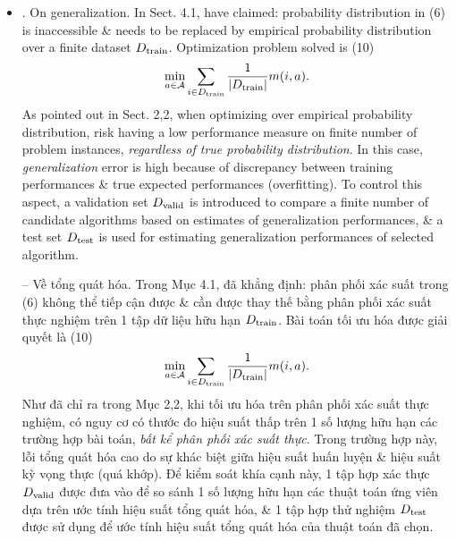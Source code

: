 \documentclass{article}
\begin{document}
\begin{itemize}
\begin{itemize}
        \item {. On generalization.} In Sect. 4.1, have claimed: probability distribution in (6) is inaccessible \& needs to be replaced by empirical probability distribution over a finite dataset $D_{\rm train}$. Optimization problem solved is (10)
        \begin{equation*}
            \min_{a\in{\cal A}}\sum_{i\in D_{\rm train}} \frac{1}{|D_{\rm train}|}m(i,a).
        \end{equation*}
        As pointed out in Sect. 2,2, when optimizing over empirical probability distribution, risk having a low performance measure on finite number of problem instances, {\it regardless of true probability distribution}. In this case, {\it generalization} error is high because of discrepancy between training performances \& true expected performances (overﬁtting). To control this aspect, a validation set $D_{\rm valid}$ is introduced to compare a finite number of candidate algorithms based on estimates of generalization performances, \& a test set $D_{\rm test}$ is used for estimating generalization performances of selected algorithm.

        -- {\sf Về tổng quát hóa.} Trong Mục 4.1, đã khẳng định: phân phối xác suất trong (6) không thể tiếp cận được \& cần được thay thế bằng phân phối xác suất thực nghiệm trên 1 tập dữ liệu hữu hạn $D_{\rm train}$. Bài toán tối ưu hóa được giải quyết là (10)
        \begin{equation*}
            \min_{a\in{\cal A}}\sum_{i\in D_{\rm train}} \frac{1}{|D_{\rm train}|}m(i,a).
        \end{equation*}
        Như đã chỉ ra trong Mục 2,2, khi tối ưu hóa trên phân phối xác suất thực nghiệm, có nguy cơ có thước đo hiệu suất thấp trên 1 số lượng hữu hạn các trường hợp bài toán, {\it bất kể phân phối xác suất thực}. Trong trường hợp này, lỗi tổng quát hóa {\it} cao do sự khác biệt giữa hiệu suất huấn luyện \& hiệu suất kỳ vọng thực (quá khớp). Để kiểm soát khía cạnh này, 1 tập hợp xác thực $D_{\rm valid}$ được đưa vào để so sánh 1 số lượng hữu hạn các thuật toán ứng viên dựa trên ước tính hiệu suất tổng quát hóa, \& 1 tập hợp thử nghiệm $D_{\rm test}$ được sử dụng để ước tính hiệu suất tổng quát hóa của thuật toán đã chọn.


\end{itemize}
\end{itemize}
\end{document}
